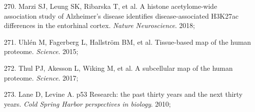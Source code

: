 \documentclass[11pt,twoside]{bristolthesis}
\newenvironment{cslreferences}%
  {}%
  {\par}
\begin{document}
\begin{cslreferences}
\leavevmode\hypertarget{ref-Marzi2018}{}%
270. Marzi SJ, Leung SK, Ribarska T, et al. A histone acetylome-wide association study of Alzheimer's disease identifies disease-associated H3K27ac differences in the entorhinal cortex. \emph{Nature Neuroscience}. 2018;

\leavevmode\hypertarget{ref-Uhlen2015}{}%
271. Uhlén M, Fagerberg L, Hallström BM, et al. Tissue-based map of the human proteome. \emph{Science}. 2015;

\leavevmode\hypertarget{ref-Thul2017}{}%
272. Thul PJ, Akesson L, Wiking M, et al. A subcellular map of the human proteome. \emph{Science}. 2017;

\leavevmode\hypertarget{ref-Lane2010}{}%
273. Lane D, Levine A. p53 Research: the past thirty years and the next thirty years. \emph{Cold Spring Harbor perspectives in biology}. 2010;
\end{cslreferences}
\end{document}
